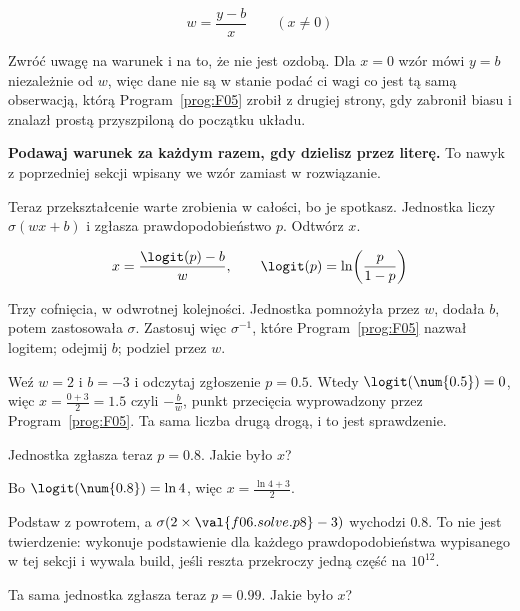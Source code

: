 \begin{fr}
\begin{ansblock}
\[ w = \frac{y - b}{x} \qquad (x \ne 0) \]
\end{ansblock}

Zwróć uwagę na warunek i na to, że nie jest ozdobą. Dla $x = 0$ wzór mówi
$y = b$ niezależnie od $w$, więc dane nie są w stanie podać ci wagi \dash{} co
jest tą samą obserwacją, którą Program~\ref{prog:F05} zrobił z drugiej strony,
gdy zabronił biasu i znalazł prostą przyszpiloną do początku układu.

\textbf{Podawaj warunek za każdym razem, gdy dzielisz przez literę.} To nawyk
z poprzedniej sekcji wpisany we wzór zamiast w rozwiązanie.

Teraz przekształcenie warte zrobienia w całości, bo je spotkasz. Jednostka
liczy $\sigma(wx + b)$ i zgłasza prawdopodobieństwo $p$. Odtwórz $x$.
\nextframe
\end{fr}

\begin{fr}
\begin{ansblock}
\[ x = \frac{\logit(p) - b}{w}, \qquad
   \logit(p) = \ln\!\left(\frac{p}{1-p}\right) \]
\end{ansblock}

Trzy cofnięcia, w odwrotnej kolejności. Jednostka pomnożyła przez $w$, dodała
$b$, potem zastosowała $\sigma$. Zastosuj więc $\sigma^{-1}$, które
Program~\ref{prog:F05} nazwał logitem; odejmij $b$; podziel przez $w$.

Weź $w = 2$ i $b = -3$ i odczytaj zgłoszenie $p = \num{0.5}$. Wtedy
$\logit(\num{0.5}) = 0$, więc $x = \frac{0 + 3}{2} = \num{1.5}$ \dash{} czyli
$-\frac{b}{w}$, punkt przecięcia wyprowadzony przez Program~\ref{prog:F05}. Ta
sama liczba drugą drogą, i to jest sprawdzenie.

Jednostka zgłasza teraz $p = \num{0.8}$. Jakie było $x$?
\nextframe
\end{fr}

\begin{fr}
Bo $\logit(\num{0.8}) = \ln 4$, więc $x = \frac{\ln 4 + 3}{2}$.

Podstaw z powrotem, a $\sigma(2 \times \val{f06.solve.p8} - 3)$ wychodzi
$\num{0.8}$. To nie jest twierdzenie:  wykonuje
podstawienie dla każdego prawdopodobieństwa wypisanego w tej sekcji i wywala
build, jeśli reszta przekroczy jedną część na $10^{12}$.

Ta sama jednostka zgłasza teraz $p = \num{0.99}$. Jakie było $x$?
\nextframe
\end{fr}

